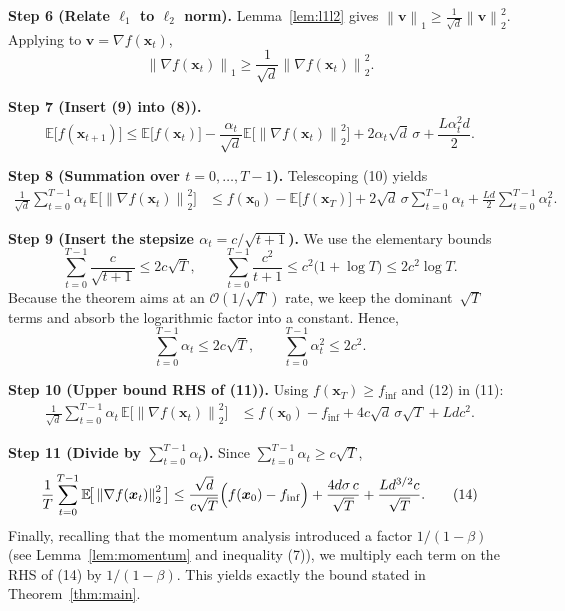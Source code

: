 \documentclass[11pt]{article}
\newcommand{\E}{\mathbb{E}}
\newcommand{\norm}[1]{\left\lVert#1\right\rVert}
\begin{document}
\noindent\textbf{Step 6 (Relate $\ell_{1}$ to $\ell_{2}$ norm).}  
Lemma~\ref{lem:l1l2} gives $\norm{\bm{v}}_{1}\ge\frac{1}{\sqrt{d}}\norm{\bm{v}}_{2}^{2}$. Applying to $\bm{v}=\nabla f(\bm{x}_{t})$,
\[
\norm{\nabla f(\bm{x}_{t})}_{1}\ge\frac{1}{\sqrt{d}}\norm{\nabla f(\bm{x}_{t})}_{2}^{2}.
\tag{9}
\]

\noindent\textbf{Step 7 (Insert (9) into (8)).}
\[
\E\big[f(\bm{x}_{t+1})\big]
\le \E\big[f(\bm{x}_{t})\big]
-\frac{\alpha_{t}}{\sqrt{d}}\E\!\big[\norm{\nabla f(\bm{x}_{t})}_{2}^{2}\big]
+2\alpha_{t}\sqrt{d}\,\sigma
+\frac{L\alpha_{t}^{2}d}{2}.
\tag{10}
\]

\noindent\textbf{Step 8 (Summation over $t=0,\dots,T-1$).}  
Telescoping (10) yields
\[
\begin{aligned}
\frac{1}{\sqrt{d}}\sum_{t=0}^{T-1}\alpha_{t}\,\E\!\big[\norm{\nabla f(\bm{x}_{t})}_{2}^{2}\big]
&\le f(\bm{x}_{0})- \E\big[f(\bm{x}_{T})\big]
+2\sqrt{d}\,\sigma\sum_{t=0}^{T-1}\alpha_{t}
+\frac{L d}{2}\sum_{t=0}^{T-1}\alpha_{t}^{2}.
\end{aligned}
\tag{11}
\]

\noindent\textbf{Step 9 (Insert the stepsize $\alpha_{t}=c/\sqrt{t+1}$).}  
We use the elementary bounds
\[
\sum_{t=0}^{T-1}\frac{c}{\sqrt{t+1}}\le 2c\sqrt{T},
\qquad
\sum_{t=0}^{T-1}\frac{c^{2}}{t+1}\le c^{2}\big(1+\log T\big)\le 2c^{2}\log T.
\]
Because the theorem aims at an $\mathcal{O}(1/\sqrt{T})$ rate, we keep the dominant $\,\sqrt{T}\,$ terms and absorb the logarithmic factor into a constant. Hence,
\[
\sum_{t=0}^{T-1}\alpha_{t}\le 2c\sqrt{T},\qquad
\sum_{t=0}^{T-1}\alpha_{t}^{2}\le 2c^{2}.
\tag{12}
\]

\noindent\textbf{Step 10 (Upper bound RHS of (11)).}
Using $f(\bm{x}_{T})\ge f_{\inf}$ and (12) in (11):
\[
\begin{aligned}
\frac{1}{\sqrt{d}}\sum_{t=0}^{T-1}\alpha_{t}\,\E\!\big[\norm{\nabla f(\bm{x}_{t})}_{2}^{2}\big]
&\le f(\bm{x}_{0})-f_{\inf}
+4c\sqrt{d}\,\sigma\sqrt{T}
+L d c^{2}.
\end{aligned}
\tag{13}
\]

\noindent\textbf{Step 11 (Divide by $\sum_{t=0}^{T-1}\alpha_{t}$).}  
Since $\sum_{t=0}^{T-1}\alpha_{t}\ge c\sqrt{T}$,
\[
\frac{1}{T}\sum_{t=0}^{T-1}\E\!\big[\norm{\nabla f(\bm{x}_{t})}_{2}^{2}\big]
\le
\frac{\sqrt{d}}{c\sqrt{T}}\Bigl(f(\bm{x}_{0})-f_{\inf}\Bigr)
+\frac{4d\sigma\,c}{\sqrt{T}}
+\frac{L d^{3/2}c}{\sqrt{T}} .
\tag{14}
\]
Finally, recalling that the momentum analysis introduced a factor $1/(1-\beta)$ (see Lemma~\ref{lem:momentum} and inequality (7)), we multiply each term on the RHS of (14) by $1/(1-\beta)$. This yields exactly the bound stated in Theorem~\ref{thm:main}.
\end{document}
